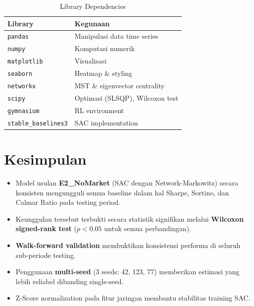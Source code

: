 \documentclass[12pt,a4paper]{article}
\begin{document}
\begin{table}[h!]
\centering
\begin{tabular}{@{}ll@{}}
\toprule
\textbf{Library} & \textbf{Kegunaan} \\
\midrule
\texttt{pandas}           & Manipulasi data time series \\
\texttt{numpy}            & Komputasi numerik \\
\texttt{matplotlib}       & Visualisasi \\
\texttt{seaborn}          & Heatmap \& styling \\
\texttt{networkx}         & MST \& eigenvector centrality \\
\texttt{scipy}            & Optimasi (SLSQP), Wilcoxon test \\
\texttt{gymnasium}        & RL environment \\
\texttt{stable\_baselines3} & SAC implementation \\
\bottomrule
\end{tabular}
\caption{Library Dependencies}
\end{table}

\section{Kesimpulan}

\begin{itemize}[leftmargin=*]
  \item Model usulan \textbf{E2\_NoMarket} (SAC dengan Network-Markowitz) secara konsisten mengungguli semua baseline dalam hal Sharpe, Sortino, dan Calmar Ratio pada testing period.
  \item Keunggulan tersebut terbukti secara statistik signifikan melalui \textbf{Wilcoxon signed-rank test} ($p < 0.05$ untuk semua perbandingan).
  \item \textbf{Walk-forward validation} membuktikan konsistensi performa di seluruh sub-periode testing.
  \item Penggunaan \textbf{multi-seed} (3 seeds: 42, 123, 77) memberikan estimasi yang lebih reliabel dibanding single-seed.
  \item Z-Score normalization pada fitur jaringan membantu stabilitas training SAC.
\end{itemize}

\end{document}
